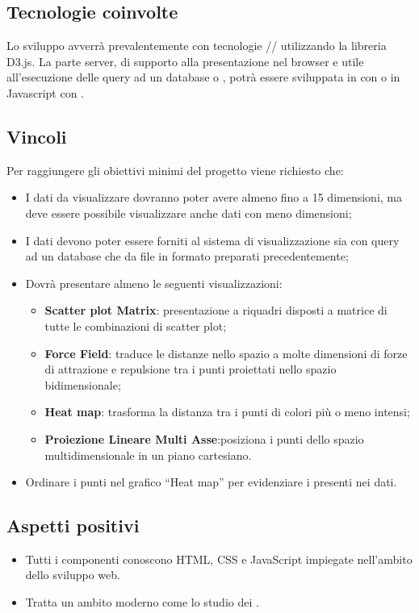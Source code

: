 \subsection{Tecnologie coinvolte}
Lo sviluppo avverrà prevalentemente con tecnologie // utilizzando la libreria D3.js.
La parte server, di supporto alla presentazione nel browser e utile all'esecuzione delle query ad un database  o , potrà essere sviluppata in  con  o in Javascript con .

\subsection{Vincoli}
Per raggiungere gli obiettivi minimi del progetto viene richiesto che:
\begin{itemize}
	\item I dati da visualizzare dovranno poter avere almeno fino a 15 dimensioni, ma deve essere possibile visualizzare anche dati con meno dimensioni;
	\item I dati devono poter essere forniti al sistema di visualizzazione sia con query ad un database che da file in formato  preparati precedentemente;
	\item Dovrà presentare almeno le seguenti visualizzazioni:
	\begin{itemize}
		\item \textbf{Scatter plot Matrix}: presentazione a riquadri disposti a matrice di tutte le combinazioni di scatter plot;
		\item \textbf{Force Field}: traduce le distanze nello spazio a molte dimensioni di forze di attrazione e repulsione tra i punti proiettati nello spazio bidimensionale;
		\item \textbf{Heat map}: trasforma la distanza tra i punti di colori più o meno intensi;
		\item \textbf{Proiezione Lineare Multi Asse}:posiziona i punti dello spazio multidimensionale in un piano
		cartesiano.
	\end{itemize}
	\item Ordinare i punti nel grafico “Heat map” per evidenziare i  presenti nei dati.
\end{itemize}

\subsection{Aspetti positivi}
\begin{itemize}
	\item Tutti i componenti conoscono HTML, CSS e JavaScript impiegate nell'ambito dello sviluppo web.
	\item Tratta un ambito moderno come lo studio dei .
\end{itemize}

